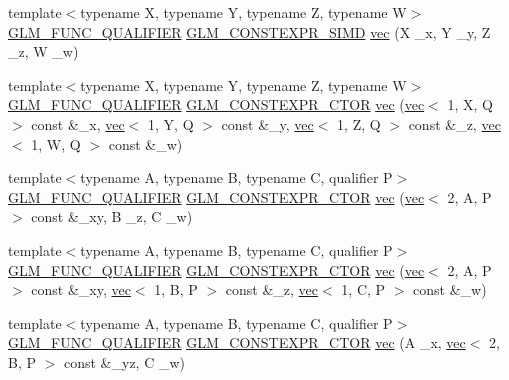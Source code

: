 \begin{DoxyCompactItemize}
{\footnotesize template$<$typename X, typename Y, typename Z, typename W$>$ }\\\hyperlink{setup_8hpp_a33fdea6f91c5f834105f7415e2a64407}{G\+L\+M\+\_\+\+F\+U\+N\+C\+\_\+\+Q\+U\+A\+L\+I\+F\+I\+ER} \hyperlink{setup_8hpp_ae5de828d10226b21e2123dd61f3cb5ed}{G\+L\+M\+\_\+\+C\+O\+N\+S\+T\+E\+X\+P\+R\+\_\+\+S\+I\+MD} \hyperlink{structglm_1_1vec_3_014_00_01_t_00_01_q_01_4_a44db69557e499193fa5d8514132c6e24}{vec} (X \+\_\+x, Y \+\_\+y, Z \+\_\+z, W \+\_\+w)
\item 
{\footnotesize template$<$typename X, typename Y, typename Z, typename W$>$ }\\\hyperlink{setup_8hpp_a33fdea6f91c5f834105f7415e2a64407}{G\+L\+M\+\_\+\+F\+U\+N\+C\+\_\+\+Q\+U\+A\+L\+I\+F\+I\+ER} \hyperlink{setup_8hpp_ad34178a09666081abdb573c14d1f4a5a}{G\+L\+M\+\_\+\+C\+O\+N\+S\+T\+E\+X\+P\+R\+\_\+\+C\+T\+OR} \hyperlink{structglm_1_1vec_3_014_00_01_t_00_01_q_01_4_af503ad0b89fdb859450b2e0896c8357f}{vec} (\hyperlink{structglm_1_1vec}{vec}$<$ 1, X, Q $>$ const \&\+\_\+x, \hyperlink{structglm_1_1vec}{vec}$<$ 1, Y, Q $>$ const \&\+\_\+y, \hyperlink{structglm_1_1vec}{vec}$<$ 1, Z, Q $>$ const \&\+\_\+z, \hyperlink{structglm_1_1vec}{vec}$<$ 1, W, Q $>$ const \&\+\_\+w)
\item 
{\footnotesize template$<$typename A, typename B, typename C, qualifier P$>$ }\\\hyperlink{setup_8hpp_a33fdea6f91c5f834105f7415e2a64407}{G\+L\+M\+\_\+\+F\+U\+N\+C\+\_\+\+Q\+U\+A\+L\+I\+F\+I\+ER} \hyperlink{setup_8hpp_ad34178a09666081abdb573c14d1f4a5a}{G\+L\+M\+\_\+\+C\+O\+N\+S\+T\+E\+X\+P\+R\+\_\+\+C\+T\+OR} \hyperlink{structglm_1_1vec_3_014_00_01_t_00_01_q_01_4_a1624a51ea4a5641d8d6a49dc499fcae9}{vec} (\hyperlink{structglm_1_1vec}{vec}$<$ 2, A, P $>$ const \&\+\_\+xy, B \+\_\+z, C \+\_\+w)
\item 
{\footnotesize template$<$typename A, typename B, typename C, qualifier P$>$ }\\\hyperlink{setup_8hpp_a33fdea6f91c5f834105f7415e2a64407}{G\+L\+M\+\_\+\+F\+U\+N\+C\+\_\+\+Q\+U\+A\+L\+I\+F\+I\+ER} \hyperlink{setup_8hpp_ad34178a09666081abdb573c14d1f4a5a}{G\+L\+M\+\_\+\+C\+O\+N\+S\+T\+E\+X\+P\+R\+\_\+\+C\+T\+OR} \hyperlink{structglm_1_1vec_3_014_00_01_t_00_01_q_01_4_af06a1fc4d33ca1bc9b1bf7c54d1b7271}{vec} (\hyperlink{structglm_1_1vec}{vec}$<$ 2, A, P $>$ const \&\+\_\+xy, \hyperlink{structglm_1_1vec}{vec}$<$ 1, B, P $>$ const \&\+\_\+z, \hyperlink{structglm_1_1vec}{vec}$<$ 1, C, P $>$ const \&\+\_\+w)
\item 
{\footnotesize template$<$typename A, typename B, typename C, qualifier P$>$ }\\\hyperlink{setup_8hpp_a33fdea6f91c5f834105f7415e2a64407}{G\+L\+M\+\_\+\+F\+U\+N\+C\+\_\+\+Q\+U\+A\+L\+I\+F\+I\+ER} \hyperlink{setup_8hpp_ad34178a09666081abdb573c14d1f4a5a}{G\+L\+M\+\_\+\+C\+O\+N\+S\+T\+E\+X\+P\+R\+\_\+\+C\+T\+OR} \hyperlink{structglm_1_1vec_3_014_00_01_t_00_01_q_01_4_a4e0096b6a4a96926e0ab495f3cb52403}{vec} (A \+\_\+x, \hyperlink{structglm_1_1vec}{vec}$<$ 2, B, P $>$ const \&\+\_\+yz, C \+\_\+w)

\end{DoxyCompactItemize}
